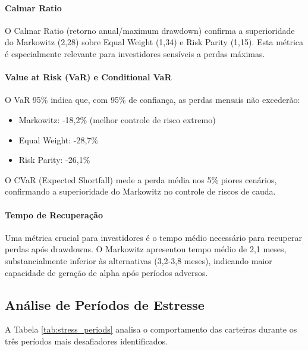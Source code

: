 \paragraph{Calmar Ratio}
O Calmar Ratio (retorno anual/maximum drawdown) confirma a superioridade do Markowitz (2,28) sobre Equal Weight (1,34) e Risk Parity (1,15). Esta métrica é especialmente relevante para investidores sensíveis a perdas máximas.

\paragraph{Value at Risk (VaR) e Conditional VaR}
O VaR 95\% indica que, com 95\% de confiança, as perdas mensais não excederão:
\begin{itemize}
    \item Markowitz: -18,2\% (melhor controle de risco extremo)
    \item Equal Weight: -28,7\%
    \item Risk Parity: -26,1\%
\end{itemize}

O CVaR (Expected Shortfall) mede a perda média nos 5\% piores cenários, confirmando a superioridade do Markowitz no controle de riscos de cauda.

\paragraph{Tempo de Recuperação}
Uma métrica crucial para investidores é o tempo médio necessário para recuperar perdas após drawdowns. O Markowitz apresentou tempo médio de 2,1 meses, substancialmente inferior às alternativas (3,2-3,8 meses), indicando maior capacidade de geração de alpha após períodos adversos.

\subsection{Análise de Períodos de Estresse}

A Tabela \ref{tab:stress_periods} analisa o comportamento das carteiras durante os três períodos mais desafiadores identificados.

